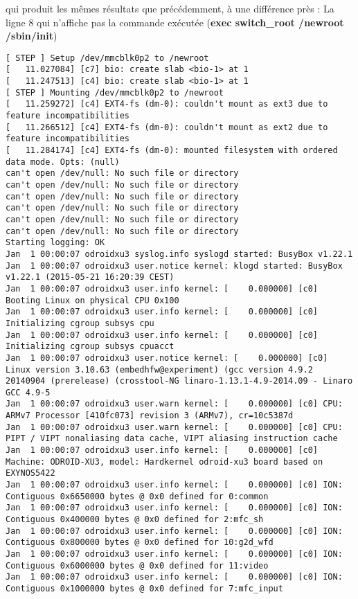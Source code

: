 qui produit les mêmes résultats que précédemment, à une différence près : La ligne 8 qui n'affiche pas la commande exécutée (\textbf{exec switch\_root /newroot /sbin/init})
\begin{lstlisting}
[ STEP ] Setup /dev/mmcblk0p2 to /newroot
[   11.027084] [c7] bio: create slab <bio-1> at 1
[   11.247513] [c4] bio: create slab <bio-1> at 1
[ STEP ] Mounting /dev/mmcblk0p2 to /newroot
[   11.259272] [c4] EXT4-fs (dm-0): couldn't mount as ext3 due to feature incompatibilities
[   11.266512] [c4] EXT4-fs (dm-0): couldn't mount as ext2 due to feature incompatibilities
[   11.284174] [c4] EXT4-fs (dm-0): mounted filesystem with ordered data mode. Opts: (null)
can't open /dev/null: No such file or directory
can't open /dev/null: No such file or directory
can't open /dev/null: No such file or directory
can't open /dev/null: No such file or directory
can't open /dev/null: No such file or directory
can't open /dev/null: No such file or directory
Starting logging: OK
Jan  1 00:00:07 odroidxu3 syslog.info syslogd started: BusyBox v1.22.1
Jan  1 00:00:07 odroidxu3 user.notice kernel: klogd started: BusyBox v1.22.1 (2015-05-21 16:20:39 CEST)
Jan  1 00:00:07 odroidxu3 user.info kernel: [    0.000000] [c0] Booting Linux on physical CPU 0x100
Jan  1 00:00:07 odroidxu3 user.info kernel: [    0.000000] [c0] Initializing cgroup subsys cpu
Jan  1 00:00:07 odroidxu3 user.info kernel: [    0.000000] [c0] Initializing cgroup subsys cpuacct
Jan  1 00:00:07 odroidxu3 user.notice kernel: [    0.000000] [c0] Linux version 3.10.63 (embedhfw@experiment) (gcc version 4.9.2 20140904 (prerelease) (crosstool-NG linaro-1.13.1-4.9-2014.09 - Linaro GCC 4.9-5
Jan  1 00:00:07 odroidxu3 user.warn kernel: [    0.000000] [c0] CPU: ARMv7 Processor [410fc073] revision 3 (ARMv7), cr=10c5387d
Jan  1 00:00:07 odroidxu3 user.warn kernel: [    0.000000] [c0] CPU: PIPT / VIPT nonaliasing data cache, VIPT aliasing instruction cache
Jan  1 00:00:07 odroidxu3 user.info kernel: [    0.000000] [c0] Machine: ODROID-XU3, model: Hardkernel odroid-xu3 board based on EXYNOS5422
Jan  1 00:00:07 odroidxu3 user.info kernel: [    0.000000] [c0] ION: Contiguous 0x6650000 bytes @ 0x0 defined for 0:common
Jan  1 00:00:07 odroidxu3 user.info kernel: [    0.000000] [c0] ION: Contiguous 0x400000 bytes @ 0x0 defined for 2:mfc_sh
Jan  1 00:00:07 odroidxu3 user.info kernel: [    0.000000] [c0] ION: Contiguous 0x800000 bytes @ 0x0 defined for 10:g2d_wfd
Jan  1 00:00:07 odroidxu3 user.info kernel: [    0.000000] [c0] ION: Contiguous 0x6000000 bytes @ 0x0 defined for 11:video
Jan  1 00:00:07 odroidxu3 user.info kernel: [    0.000000] [c0] ION: Contiguous 0x1000000 bytes @ 0x0 defined for 7:mfc_input

\end{lstlisting}
